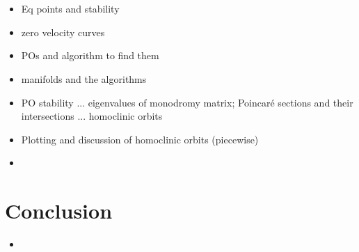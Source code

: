 \documentclass[11pt]{article} %
\begin{document}
\section*{\color{red}{Periodic/Homoclinic Orbits}}
\begin{itemize}
	\item \color{red}Eq points and stability
	\item zero velocity curves
	\item POs and algorithm to find them
	\item manifolds and the algorithms
	\item PO stability ... eigenvalues of monodromy matrix; Poincaré sections and their intersections ... homoclinic orbits
	\item Plotting and discussion of homoclinic orbits (piecewise)
	\item \color{black}
\end{itemize}

\section*{Conclusion}
\begin{itemize}
	\item \color{red}{Homoclinic orbits are cool/interesting, but for spacecraft applications they aren't very useful; Heteroclinic orbits are useful fa show}\color{black}
\end{itemize}

\newpage


\end{document}
